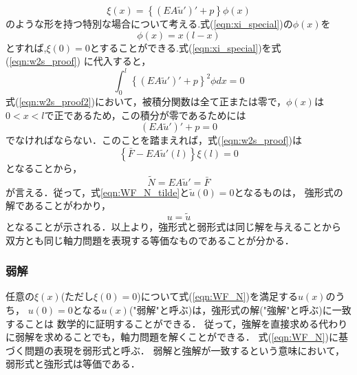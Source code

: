 \documentclass[10pt,a4j]{jarticle}
\begin{document}
\begin{equation}
	\xi (x) =\left\{ (EA\tilde u')'+p \right\} \phi(x)
	\label{eqn:xi_special}
\end{equation}
のような形を持つ特別な場合について考える.式(\ref{eqn:xi_special})の$\phi(x)$を
\begin{equation}
	\phi(x)= x(l-x)
	\label{eqn:}
\end{equation}
とすれば,$\xi(0)=0$とすることができる.式(\ref{eqn:xi_special})を式(\ref{eqn:w2s_proof})
に代入すると，
\begin{equation}
	\int_0^l \left\{ (EA\tilde u')'+p \right\}^2\phi dx =0
	\label{eqn:w2s_proof2}
\end{equation}
式(\ref{eqn:w2s_proof2})において，被積分関数は全て正または零で，$\phi(x)$は
$0<x<l$で正であるため，この積分が零であるためには
\begin{equation}
	(EA\tilde u')'+p =0
	\label{eqn:}
\end{equation}
でなければならない．このことを踏まえれば，式(\ref{eqn:w2s_proof})は
\begin{equation}
	\left\{ \bar F-EA\tilde u'(l)\right\}\xi(l) =0
	\label{eqn:}
\end{equation}
となることから，
\begin{equation}
	\tilde N =EA\tilde u' =\bar F
	\label{eqn:}
\end{equation}
が言える．従って，式\ref{eqn:WF_N_tilde}と$\tilde u(0)=0$となるものは，
強形式の解であることがわかり，
\begin{equation}
	u=\tilde u
	\label{eqn:w2s}
\end{equation}
となることが示される．以上より，強形式と弱形式は同じ解を与えることから
双方とも同じ軸力問題を表現する等価なものであることが分かる．
\subsubsection{弱解}
任意の$\xi(x)$(ただし$\xi(0)=0$)について式(\ref{eqn:WF_N})を満足する$u(x)$のうち，
$u(0)=0$となる$u(x)$("弱解"と呼ぶ)は，強形式の解("強解"と呼ぶ)に一致することは
数学的に証明することができる．
従って，強解を直接求める代わりに弱解を求めることでも，軸力問題を解くことができる．
式(\ref{eqn:WF_N})に基づく問題の表現を弱形式と呼ぶ．
弱解と強解が一致するという意味において，弱形式と強形式は等価である．
\end{document}
